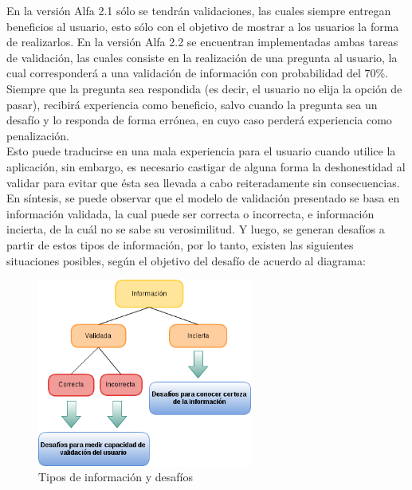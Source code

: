 \documentclass[10pt,letterpaper]{article}
\begin{document}
  En la versión Alfa 2.1 sólo se tendrán validaciones, las cuales siempre entregan beneficios al usuario, esto sólo con el objetivo de mostrar a los usuarios la forma de realizarlos. En la versión Alfa 2.2 se encuentran implementadas ambas tareas de validación, las cuales consiste en la realización de una pregunta al usuario, la cual corresponderá a una validación de información con probabilidad del 70\%.\\

  Siempre que la pregunta sea respondida (es decir, el usuario no elija la opción de pasar), recibirá experiencia como beneficio, salvo cuando la pregunta sea un desafío y lo responda de forma errónea, en cuyo caso perderá experiencia como penalización.\\
  
  Esto puede traducirse en una mala experiencia para el usuario cuando utilice la aplicación, sin embargo, es necesario castigar de alguna forma la deshonestidad al validar para evitar que ésta sea llevada a cabo reiteradamente sin consecuencias.\\
\newpage
En síntesis, se puede observar que el modelo de validación presentado se basa en información validada, la cual puede ser correcta o incorrecta, e información incierta, de la cuál no se sabe su verosimilitud. Y luego, se generan desafíos a partir de estos tipos de información, por lo tanto, existen las siguientes situaciones posibles, según el objetivo del desafío de acuerdo al diagrama:\\


\begin{figure}[h]
\begin{center}
\includegraphics[width=200pt]{./imgs/Info.png}
\caption{Tipos de información y desafíos}
\end{center}
\end{figure}
\end{document}
